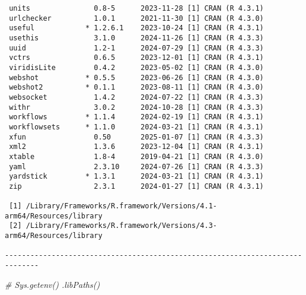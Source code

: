 \documentclass[
]{article}
\newenvironment{Shaded}{}{}
\newcommand{\CommentTok}[1]{\textcolor[rgb]{0.38,0.63,0.69}{\textit{#1}}}
\begin{document}
\begin{verbatim}
 units               0.8-5      2023-11-28 [1] CRAN (R 4.3.1)
 urlchecker          1.0.1      2021-11-30 [1] CRAN (R 4.3.0)
 useful            * 1.2.6.1    2023-10-24 [1] CRAN (R 4.3.1)
 usethis             3.1.0      2024-11-26 [1] CRAN (R 4.3.3)
 uuid                1.2-1      2024-07-29 [1] CRAN (R 4.3.3)
 vctrs               0.6.5      2023-12-01 [1] CRAN (R 4.3.1)
 viridisLite         0.4.2      2023-05-02 [1] CRAN (R 4.3.0)
 webshot           * 0.5.5      2023-06-26 [1] CRAN (R 4.3.0)
 webshot2          * 0.1.1      2023-08-11 [1] CRAN (R 4.3.0)
 websocket           1.4.2      2024-07-22 [1] CRAN (R 4.3.3)
 withr               3.0.2      2024-10-28 [1] CRAN (R 4.3.3)
 workflows         * 1.1.4      2024-02-19 [1] CRAN (R 4.3.1)
 workflowsets      * 1.1.0      2024-03-21 [1] CRAN (R 4.3.1)
 xfun                0.50       2025-01-07 [1] CRAN (R 4.3.3)
 xml2                1.3.6      2023-12-04 [1] CRAN (R 4.3.1)
 xtable              1.8-4      2019-04-21 [1] CRAN (R 4.3.0)
 yaml                2.3.10     2024-07-26 [1] CRAN (R 4.3.3)
 yardstick         * 1.3.1      2024-03-21 [1] CRAN (R 4.3.1)
 zip                 2.3.1      2024-01-27 [1] CRAN (R 4.3.1)

 [1] /Library/Frameworks/R.framework/Versions/4.1-arm64/Resources/library
 [2] /Library/Frameworks/R.framework/Versions/4.3-arm64/Resources/library

------------------------------------------------------------------------------
\end{verbatim}

\begin{Shaded}
\begin{Highlighting}[numbers=left,,]
\CommentTok{\# Sys.getenv() .libPaths()}
\end{Highlighting}
\end{Shaded}
\end{document}
